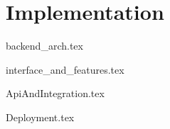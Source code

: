 \chapter{Implementation}
{backend_arch.tex}

{interface_and_features.tex}

{ApiAndIntegration.tex}

{Deployment.tex}
